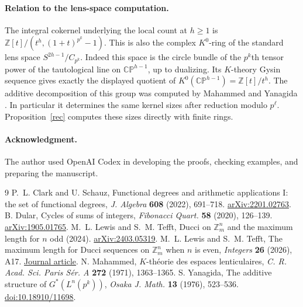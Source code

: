 \documentclass[11pt,letterpaper]{article}
\newcommand{\Z}{\mathbb Z}
\begin{document}
\paragraph{Relation to the lens-space computation.}
The integral cokernel underlying the local count at $h\ge1$ is
$\Z[t]/(t^h,(1+t)^{p^k}-1)$. This is also the complex $K^0$-ring of the
standard lens space $S^{2h-1}/C_{p^k}$. Indeed this space is the circle
bundle of the $p^k$th tensor power of the tautological line on
$\mathbb{CP}^{h-1}$, up to dualizing. Its $K$-theory Gysin sequence gives
exactly the displayed quotient of $K^0(\mathbb{CP}^{h-1})=\Z[t]/t^h$.
The additive decomposition of this group was computed by Mahammed and
Yanagida \cite{ma,ya}. In particular it determines the same kernel sizes
after reduction modulo $p^\ell$. Proposition~\ref{rec} computes these
sizes directly with finite rings.

\paragraph{Acknowledgment.}
The author used OpenAI Codex in developing the proofs, checking examples,
and preparing the manuscript.

\begin{thebibliography}{9}\small
{} P.~L. Clark and U. Schauz, Functional degrees and arithmetic
applications I: the set of functional degrees, \emph{J. Algebra}
\textbf{608} (2022), 691--718. \href{https://arxiv.org/abs/2201.02763}{arXiv:2201.02763}.
 B. Dular, Cycles of sums of integers, \emph{Fibonacci Quart.}
\textbf{58} (2020), 126--139. \href{https://arxiv.org/abs/1905.01765}{arXiv:1905.01765}.
 M.~L. Lewis and S.~M. Tefft, Ducci on $\Z_m^n$ and the maximum
length for $n$ odd (2024). \href{https://arxiv.org/abs/2403.05319}{arXiv:2403.05319}.
 M.~L. Lewis and S.~M. Tefft, The maximum length for Ducci
sequences on $\Z_m^n$ when $n$ is even, \emph{Integers} \textbf{26} (2026), A17.
\href{https://math.colgate.edu/~integers/aa17/aa17.pdf}{Journal article}.
 N. Mahammed, $K$-th\'eorie des espaces lenticulaires,
\emph{C. R. Acad. Sci. Paris S\'er. A} \textbf{272} (1971), 1363--1365.
 S. Yanagida, The additive structure of $G^*(L^n(p^k))$,
\emph{Osaka J. Math.} \textbf{13} (1976), 523--536.
\href{https://doi.org/10.18910/11698}{doi:10.18910/11698}.
\end{thebibliography}
\end{document}
